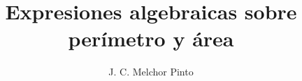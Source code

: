 \documentclass[12pt,addpoints,answers]{guia}
\title{Expresiones algebraicas sobre perímetro y área}
\author{J. C. Melchor Pinto}
\begin{document}
\pagestyle{headandfoot}

\INFO
\printanswers
\begin{questions}
    \questionboxed[5]{}
    \questionboxed[5]{}
    \questionboxed[5]{}
    \questionboxed[5]{}
    \questionboxed[10]{}
    \questionboxed[5]{}
    \questionboxed[10]{}
    \questionboxed[5]{}
    \questionboxed[5]{}
    \questionboxed[5]{}
    \questionboxed[5]{}
    \questionboxed[5]{}
    \questionboxed[5]{}
    \questionboxed[5]{}
    \questionboxed[10]{}
    \questionboxed[10]{}
\end{questions}
\end{document}
